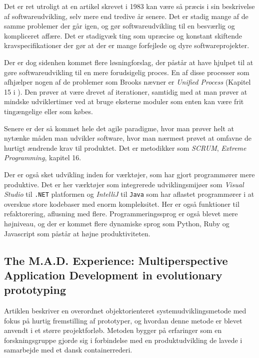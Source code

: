 \documentclass[11pt, a4paper]{article}
\begin{document}
Det er ret utroligt at en artikel skrevet i 1983 kan være så præcis i sin beskrivelse af softwareudvikling, selv mere end tredive år senere. Det er stadig mange af de samme problemer der går igen, og gør softwareudvikling til en besværlig og kompliceret affære. Det er stadigvæk ting som upræcise og konstant skiftende kravspecifikationer der gør at der er mange forfejlede og dyre softwareprojekter.

Der er dog sidenhen kommet flere løsningforslag, der påstår at have hjulpet til at gøre softwareudvikling til en mere forudsigelig proces. En af disse processer som afhjælper nogen af de problemer som Brooks nævner er \emph{Unified Process} (Kapitel 15 i \cite{OOSE}). Den prøver at være drevet af iterationer, samtidig med at man prøver at mindske udviklertimer ved at bruge eksterne moduler som enten kan være frit tingængelige eller som købes.

Senere er der så kommet hele det agile paradigme, hvor man prøver helt at nytænke måden man udvikler software, hvor man nærmest prøvet at omfavne de hurtigt ændrende krav til produktet. Det er metodikker som \emph{SCRUM}\cite{sutherland2010jeff}, \emph{Extreme Programming}\cite[]{OOSE}, kapitel 16.

Der er også sket udvikling inden for værktøjer, som har gjort programmører mere produktive. Det er her værktøjer som integrerede udviklingsmijøer som \emph{Visual Studio} til \verb!.NET! platformen og \emph{IntelliJ} til \verb!Java! som har aflastet programmører i at overskue store kodebaser med enorm kompleksitet. Her er også funktioner til refaktorering, aflusning med flere. Programmeringssprog er også blevet mere højniveau, og der er kommet flere dynamiske sprog som Python, Ruby og Javascript som påstår at højne produktiviteten.

\newpage
\subsection{The M.A.D. Experience: Multiperspective Application Development in evolutionary prototyping}
Artiklen beskriver en overordnet objektorienteret systemudviklingsmetode med fokus på hurtig fremstilling af prototyper, og hvordan denne metode er blevet anvendt i et større projektforløb. Metoden bygger på erfaringer som en forskningsgruppe gjorde sig i forbindelse med en produktudvikling de lavede i samarbejde med et dansk containerrederi.
\end{document}
